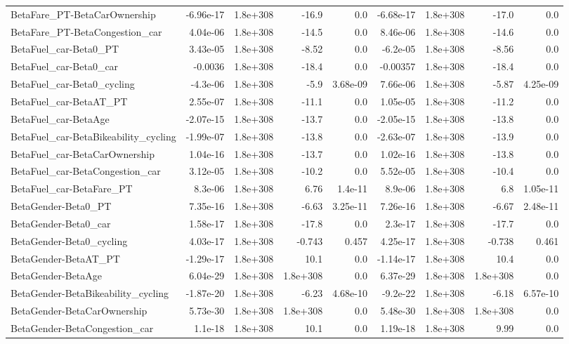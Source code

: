 \begin{tabular}{lrrrrrrrr}
BetaFare_PT-BetaCarOwnership & -6.96e-17 & 1.8e+308 & -16.9 & 0.0 & -6.68e-17 & 1.8e+308 & -17.0 & 0.0 \\
BetaFare_PT-BetaCongestion_car & 4.04e-06 & 1.8e+308 & -14.5 & 0.0 & 8.46e-06 & 1.8e+308 & -14.6 & 0.0 \\
BetaFuel_car-Beta0_PT & 3.43e-05 & 1.8e+308 & -8.52 & 0.0 & -6.2e-05 & 1.8e+308 & -8.56 & 0.0 \\
BetaFuel_car-Beta0_car & -0.0036 & 1.8e+308 & -18.4 & 0.0 & -0.00357 & 1.8e+308 & -18.4 & 0.0 \\
BetaFuel_car-Beta0_cycling & -4.3e-06 & 1.8e+308 & -5.9 & 3.68e-09 & 7.66e-06 & 1.8e+308 & -5.87 & 4.25e-09 \\
BetaFuel_car-BetaAT_PT & 2.55e-07 & 1.8e+308 & -11.1 & 0.0 & 1.05e-05 & 1.8e+308 & -11.2 & 0.0 \\
BetaFuel_car-BetaAge & -2.07e-15 & 1.8e+308 & -13.7 & 0.0 & -2.05e-15 & 1.8e+308 & -13.8 & 0.0 \\
BetaFuel_car-BetaBikeability_cycling & -1.99e-07 & 1.8e+308 & -13.8 & 0.0 & -2.63e-07 & 1.8e+308 & -13.9 & 0.0 \\
BetaFuel_car-BetaCarOwnership & 1.04e-16 & 1.8e+308 & -13.7 & 0.0 & 1.02e-16 & 1.8e+308 & -13.8 & 0.0 \\
BetaFuel_car-BetaCongestion_car & 3.12e-05 & 1.8e+308 & -10.2 & 0.0 & 5.52e-05 & 1.8e+308 & -10.4 & 0.0 \\
BetaFuel_car-BetaFare_PT & 8.3e-06 & 1.8e+308 & 6.76 & 1.4e-11 & 8.9e-06 & 1.8e+308 & 6.8 & 1.05e-11 \\
BetaGender-Beta0_PT & 7.35e-16 & 1.8e+308 & -6.63 & 3.25e-11 & 7.26e-16 & 1.8e+308 & -6.67 & 2.48e-11 \\
BetaGender-Beta0_car & 1.58e-17 & 1.8e+308 & -17.8 & 0.0 & 2.3e-17 & 1.8e+308 & -17.7 & 0.0 \\
BetaGender-Beta0_cycling & 4.03e-17 & 1.8e+308 & -0.743 & 0.457 & 4.25e-17 & 1.8e+308 & -0.738 & 0.461 \\
BetaGender-BetaAT_PT & -1.29e-17 & 1.8e+308 & 10.1 & 0.0 & -1.14e-17 & 1.8e+308 & 10.4 & 0.0 \\
BetaGender-BetaAge & 6.04e-29 & 1.8e+308 & 1.8e+308 & 0.0 & 6.37e-29 & 1.8e+308 & 1.8e+308 & 0.0 \\
BetaGender-BetaBikeability_cycling & -1.87e-20 & 1.8e+308 & -6.23 & 4.68e-10 & -9.2e-22 & 1.8e+308 & -6.18 & 6.57e-10 \\
BetaGender-BetaCarOwnership & 5.73e-30 & 1.8e+308 & 1.8e+308 & 0.0 & 5.48e-30 & 1.8e+308 & 1.8e+308 & 0.0 \\
BetaGender-BetaCongestion_car & 1.1e-18 & 1.8e+308 & 10.1 & 0.0 & 1.19e-18 & 1.8e+308 & 9.99 & 0.0 \\

\end{tabular}
